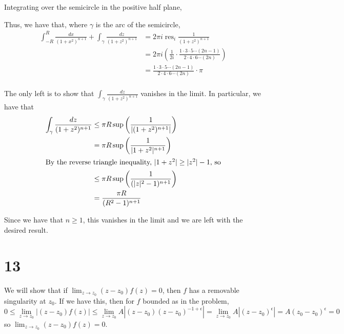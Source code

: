 \documentclass[12pt,letterpaper]{article}
\theoremstyle{definition}
\DeclareMathOperator{\res}{res}
\newcommand{\incfig}[1]{}
\begin{document}
Integrating over the semicircle in the positive half plane,
\begin{figure}[H]
  \centering
  \incfig{problem32}
\end{figure}

Thus, we have that, where $\gamma$ is the arc of the semicircle,
\begin{align*}
  \int_{-R}^{R}\frac{dx}{(1+x^{2})^{n+1}} + \int_{\gamma}\frac{dz}{(1+z^{2})^{n+1}} &= 2\pi i \res_{i}\frac{1}{(1+z^{2})^{n+1}} \\
                                                                                    &= 2\pi i\left(\frac{1}{2i} \cdot \frac{1 \cdot 3 \cdot 5 \cdots (2n-1)}{2 \cdot 4 \cdot 6 \cdots (2n)}\right) \\
                                                                                    &= \frac{1 \cdot 3 \cdot 5 \cdots (2n-1)}{2 \cdot 4 \cdot 6 \cdots (2n)}\cdot \pi \\
\end{align*}

The only left is to show that $\int_{\gamma}\frac{dz}{(1+z^{2})^{n+1}}$ vanishes in the limit. In particular, we have that
\begin{align*}
  \int_{\gamma}\frac{dz}{(1+z^{2})^{n+1}} &\leq \pi R \sup \left(\frac{1}{|(1+z^{2})^{n+1}|}\right) \\
                                          &= \pi R \sup \left(\frac{1}{|1+z^{2}|^{n+1}}\right) \\
  \intertext{By the reverse triangle inequality, $|1 + z^{2}| \geq |z^{2}| - 1$, so}
                                          &\leq \pi R \sup \left(\frac{1}{(|z|^{2} - 1)^{n+1}}\right) \\
                                          &= \frac{\pi R}{(R^{2} - 1)^{n+1}} \\
\end{align*}

Since we have that $n \geq 1$, this vanishes in the limit and we are left with the desired result.

\section*{13}

We will show that if $\lim_{z \rightarrow z_{0}}(z-z_{0})f(z)  = 0$, then $f$ has a removable singularity at $z_{0}$. If we have this, then for $f$ bounded as in the problem,
\[
  0 \leq \lim_{z \rightarrow z_{0}}|(z-z_{0})f(z)| \leq \lim_{z \rightarrow z_{0}}A|(z-z_{0})(z-z_{0})^{-1 + \epsilon}| = \lim_{z \rightarrow z_{0}}A|(z-z_{0})^{\epsilon}| = A(z_{0} - z_{0})^{\epsilon} = 0
\]
so $\lim_{z \rightarrow z_{0}}(z-z_{0})f(z) = 0$.
\end{document}
